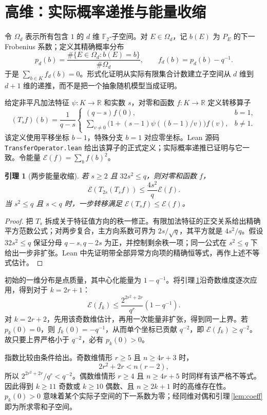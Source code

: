 \documentclass[UTF8,a4paper,11pt]{ctexart}
\numberwithin{equation}{section}
\newtheorem{lemma}[theorem]{引理}
\theoremstyle{definition}
\theoremstyle{remark}
\newcommand{\Ftwo}{\mathbb F_2}
\begin{document}
\section{高维：实际概率递推与能量收缩}

令 $\Omega_d$ 表示所有包含 $1$ 的 $d$ 维 $\Ftwo$-子空间。对 $E\in\Omega_d$，记 $b(E)$ 为 $P_E$ 的下一 Frobenius 系数；定义其精确概率分布
\[
 p_d(b)=\frac{\#\{E\in\Omega_d:b(E)=b\}}{\#\Omega_d},\qquad
 f_d(b)=p_d(b)-q^{-1}.
\]
于是 $\sum_{b\in K}f_d(b)=0$。形式化证明从实际有限集合计数建立子空间从 $d$ 维到 $d+1$ 维的递推，而不是把一个抽象随机模型当成证明。

给定非平凡加法特征 $\psi:K\to\mathbb R$ 和实数 $s$，对零和函数 $f:K\to\mathbb R$ 定义转移算子
\[
 (T_sf)(b)=\frac{1}{q-s}\begin{cases}
 (q-s)f(0),&b=1,\\[2pt]
 \displaystyle\sum_{v\ne0}\bigl(1+(s-1)\psi((b-1)/v)\bigr)f(v),&b\ne1.
 \end{cases}
\]
该定义使用平移坐标 $b-1$，特殊分支 $b=1$ 对应零坐标。Lean 源码 \texttt{TransferOperator.lean} 给出该算子的正式定义；实际概率递推已证明与它一致。令能量 $\mathcal E(f)=\sum_b f(b)^2$。

\begin{lemma}[两步能量收缩]\label{lem:energy}
若 $s\ge2$ 且 $32s^2\le q$，则对零和函数 $f$，
\[
 \mathcal E(T_{2s}(T_sf))\le\frac{4s^2}{q}\mathcal E(f).
\]
当 $s^2\le q$ 且 $s<q$ 时，一步转移满足 $\mathcal E(T_sf)\le\mathcal E(f)$。
\end{lemma}
\begin{proof}
把 $T_s$ 拆成关于特征值方向的秩一修正。有限加法特征的正交关系给出精确平方范数公式；对两步复合，主方向系数可界为 $2s/\sqrt q$，其平方就是 $4s^2/q$。假设 $32s^2\le q$ 保证分母 $q-s,q-2s$ 为正，并控制剩余秩一项；同一公式在 $s^2\le q$ 下给出一步非扩张。Lean 中先证明带全部异常方向项的精确恒等式，再作上述不等式估计。
\end{proof}

初始的一维分布是点质量，其中心化能量为 $1-q^{-1}$。将引理\,\ref{lem:energy}沿奇数维度逐次应用，得到对于 $k=2r+1$：
\[
 \mathcal E(f_k)\le \frac{2^{2r^2+2r}}{q^r}(1-q^{-1}).
\]
对 $k=2r+2$，先用该奇数维估计，再用一次能量非扩张，得到同一上界。若 $p_k(0)=0$，则 $f_k(0)=-q^{-1}$，从而单个坐标已贡献 $q^{-2}$，即 $\mathcal E(f_k)\ge q^{-2}$。故只要上界严格小于 $q^{-2}$，必有 $p_k(0)>0$。

指数比较由条件给出。奇数维情形 $r\ge5$ 且 $n\ge4r+3$ 时，
\[
 2r^2+2r<n(r-2),
\]
所以 $2^{2r^2+2r}/q^r<q^{-2}$。偶数维情形 $r\ge4$ 且 $n\ge4r+5$ 时同样有该严格不等式。因此得到 $k\ge11$ 奇数或 $k\ge10$ 偶数、且 $n\ge2k+1$ 时的高维存在性。$p_k(0)>0$ 意味着某个实际子空间的下一系数为零；经同维对偶和引理\,\ref{lem:coeff}即为所求零和子空间。
\end{document}
